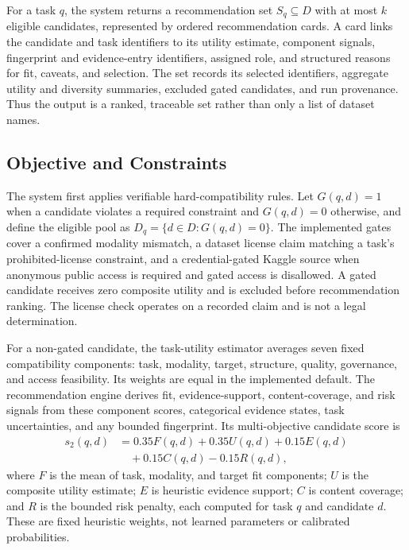 \documentclass[conference]{IEEEtran}
\begin{document}
For a task $q$, the system returns a recommendation set $S_q\subseteq D$ with at most $k$ eligible candidates, represented by ordered recommendation cards. A card links the candidate and task identifiers to its utility estimate, component signals, fingerprint and evidence-entry identifiers, assigned role, and structured reasons for fit, caveats, and selection. The set records its selected identifiers, aggregate utility and diversity summaries, excluded gated candidates, and run provenance. Thus the output is a ranked, traceable set rather than only a list of dataset names.

\subsection{Objective and Constraints}
The system first applies verifiable hard-compatibility rules. Let $G(q,d)=1$ when a candidate violates a required constraint and $G(q,d)=0$ otherwise, and define the eligible pool as $D_q=\{d\in D:G(q,d)=0\}$. The implemented gates cover a confirmed modality mismatch, a dataset license claim matching a task's prohibited-license constraint, and a credential-gated Kaggle source when anonymous public access is required and gated access is disallowed. A gated candidate receives zero composite utility and is excluded before recommendation ranking. The license check operates on a recorded claim and is not a legal determination.

For a non-gated candidate, the task-utility estimator averages seven fixed compatibility components: task, modality, target, structure, quality, governance, and access feasibility. Its weights are equal in the implemented default. The recommendation engine derives fit, evidence-support, content-coverage, and risk signals from these component scores, categorical evidence states, task uncertainties, and any bounded fingerprint. Its multi-objective candidate score is
\begin{equation}
\begin{aligned}
 s_{2}(q,d) &= 0.35F(q,d)+0.35U(q,d)+0.15E(q,d)\\
            &\quad +0.15C(q,d)-0.15R(q,d),
\end{aligned}
 \label{eq:multiobjective-score}
\end{equation}
where $F$ is the mean of task, modality, and target fit components; $U$ is the composite utility estimate; $E$ is heuristic evidence support; $C$ is content coverage; and $R$ is the bounded risk penalty, each computed for task $q$ and candidate $d$. These are fixed heuristic weights, not learned parameters or calibrated probabilities.
\end{document}
